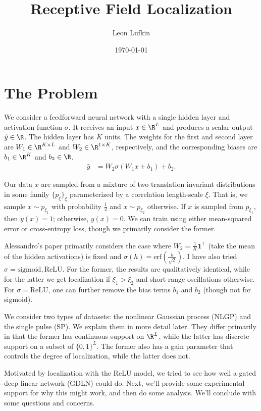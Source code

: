 \documentclass{article}
\title{Receptive Field Localization}
\author{Leon Lufkin}
\date{\today}
\begin{document}
\section{The Problem}
We consider a feedforward neural network with a single hidden layer and activation function $\sigma$.
It receives an input $x \in \R^L$ and produces a scalar output $\hat{y} \in \R$.
The hidden layer has $K$ units.
The weights for the first and second layer are $W_1 \in \R^{K \times L}$ and $W_2 \in \R^{1 \times K}$, respectively, and the corresponding biases are $b_1 \in \R^K$ and $b_2 \in \R$.
\begin{align}
  \hat{y} &= W_2 \sigma( W_1 x + b_1 ) + b_2. \label{eq:model}
\end{align}

Our data $x$ are sampled from a mixture of two translation-invariant distributions in some family $\{ p_\xi \}_{\xi}$ parameterized by a correlation length-scale $\xi$.
That is, we sample $x \sim p_{\xi_1}$ with probability $\frac{1}{2}$ and $x \sim p_{\xi_2}$ otherwise.
If $x$ is sampled from $p_{\xi_1}$, then $y(x) = 1$; otherwise, $y(x) = 0$. 
We can train using either mean-squared error or cross-entropy loss, though we primarily consider the former. 

Alessandro's paper primarily considers the case where $W_2 = \frac{1}{K} \mathbf{1}^\top$ (take the mean of the hidden activations) is fixed and $\sigma(h) = \text{erf}(\frac{h}{\sqrt{2}})$.
I have also tried $\sigma = \text{sigmoid}, \text{ReLU}$.
For the former, the results are qualitatively identical, while for the latter we get localization if $\xi_1 > \xi_2$ and short-range oscillations otherwise.
For $\sigma = \text{ReLU}$, one can further remove the bias terms $b_1$ and $b_2$ (though not for sigmoid).

We consider two types of datasets: the nonlinear Gaussian process (NLGP) and the single pulse (SP).
We explain them in more detail later.
They differ primarily in that the former has continuous support on $\R^L$, while the latter has discrete support on a subset of $\{ 0, 1 \}^L$.
The former also has a gain parameter that controls the degree of localization, while the latter does not. 

Motivated by localization with the ReLU model, we tried to see how well a gated deep linear network (GDLN) could do.
Next, we'll provide some experimental support for why this might work, and then do some analysis. 
We'll conclude with some questions and concerns.
\end{document}

